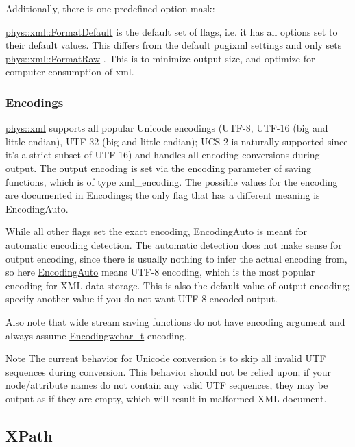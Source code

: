 Additionally, there is one predefined option mask:
\begin{DoxyItemize}
\item \hyperlink{namespacephys_1_1xml_a08bf6aab51f79929d9097706a5e64408}{phys::xml::FormatDefault} is the default set of flags, i.e. it has all options set to their default values. This differs from the default pugixml settings and only sets \hyperlink{namespacephys_1_1xml_a6f6696cbdc48011817adad7978e83976}{phys::xml::FormatRaw} . This is to minimize output size, and optimize for computer consumption of xml.
\end{DoxyItemize}\hypertarget{XMLManual_XMLSavingEncodings}{}\subsubsection{Encodings}\label{XMLManual_XMLSavingEncodings}
\hyperlink{namespacephys_1_1xml}{phys::xml} supports all popular Unicode encodings (UTF-\/8, UTF-\/16 (big and little endian), UTF-\/32 (big and little endian); UCS-\/2 is naturally supported since it's a strict subset of UTF-\/16) and handles all encoding conversions during output. The output encoding is set via the encoding parameter of saving functions, which is of type xml\_\-encoding. The possible values for the encoding are documented in Encodings; the only flag that has a different meaning is EncodingAuto. \par
 \par
 While all other flags set the exact encoding, EncodingAuto is meant for automatic encoding detection. The automatic detection does not make sense for output encoding, since there is usually nothing to infer the actual encoding from, so here \hyperlink{namespacephys_1_1xml_a420f5de782438f88160321385bea2015}{EncodingAuto} means UTF-\/8 encoding, which is the most popular encoding for XML data storage. This is also the default value of output encoding; specify another value if you do not want UTF-\/8 encoded output. \par
 \par
 Also note that wide stream saving functions do not have encoding argument and always assume \hyperlink{namespacephys_1_1xml_a420f5de782438f88160321385bea2015}{Encodingwchar\_\-t} encoding. \begin{DoxyNote}{Note}
The current behavior for Unicode conversion is to skip all invalid UTF sequences during conversion. This behavior should not be relied upon; if your node/attribute names do not contain any valid UTF sequences, they may be output as if they are empty, which will result in malformed XML document. 
\end{DoxyNote}
\hypertarget{XMLManual_XMLXPath}{}\subsection{XPath}\label{XMLManual_XMLXPath}

